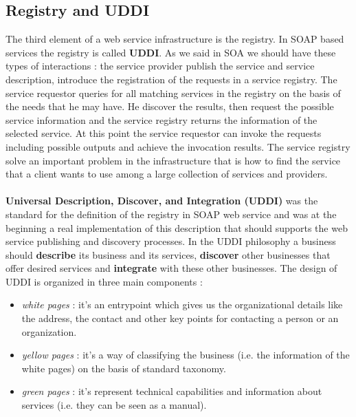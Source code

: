 \documentclass[11pt]{article}
\begin{document}
\subsection{Registry and UDDI}
The third element of a web service infrastructure is the registry. In SOAP based services the registry is called \textbf{UDDI}. As we said in SOA we should have these types of interactions : the service provider publish the service and service description, introduce the registration of the requests in a service registry. The service requestor queries for all matching services in the registry on the basis of the needs that he may have. He discover the results, then request the possible service information and the service registry returns the information of the selected service. At this point the service requestor can invoke the requests including possible outputs and achieve the invocation results. The service registry solve an important problem in the infrastructure that is how to find the service that a client wants to use among a large collection of services and providers. \\\\\textbf{Universal Description, Discover, and Integration (UDDI)} was the standard for the definition of the registry in SOAP web service and was at the beginning a real implementation of this description that should supports the web service publishing and discovery processes. In the UDDI philosophy a business should \textbf{describe} its business and its services, \textbf{discover} other businesses that offer desired services and \textbf{integrate} with these other businesses. The design of UDDI is organized in three main components :
\begin{itemize}
\item \textit{white pages} : it's an entrypoint which gives us the organizational details like the address, the contact and other key points for contacting a person or an organization.
\item \textit{yellow pages} : it's a way of classifying the business (i.e. the information of the white pages) on the basis of standard taxonomy.
\item \textit{green pages} : it's represent technical capabilities and information about services (i.e. they can be seen as a manual).
\end{itemize}
\end{document}

